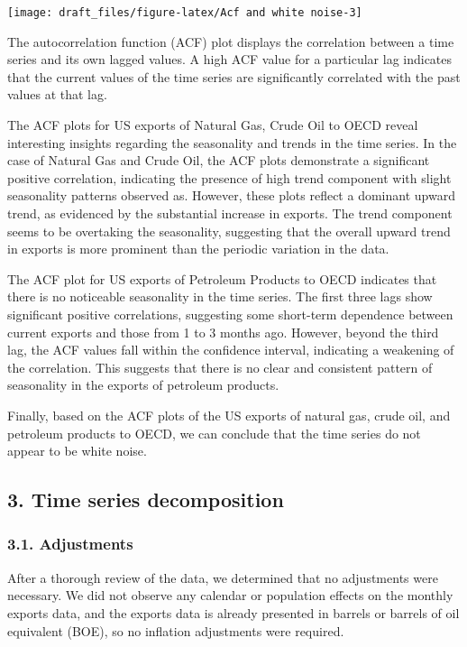 \documentclass[
]{article}
\begin{document}
\begin{center}\texttt{[image: draft\_files/figure-latex/Acf and white noise-3]} \end{center}

The autocorrelation function (ACF) plot displays the correlation between
a time series and its own lagged values. A high ACF value for a
particular lag indicates that the current values of the time series are
significantly correlated with the past values at that lag.

The ACF plots for US exports of Natural Gas, Crude Oil to OECD reveal
interesting insights regarding the seasonality and trends in the time
series. In the case of Natural Gas and Crude Oil, the ACF plots
demonstrate a significant positive correlation, indicating the presence
of high trend component with slight seasonality patterns observed as.
However, these plots reflect a dominant upward trend, as evidenced by
the substantial increase in exports. The trend component seems to be
overtaking the seasonality, suggesting that the overall upward trend in
exports is more prominent than the periodic variation in the data.

The ACF plot for US exports of Petroleum Products to OECD indicates that
there is no noticeable seasonality in the time series. The first three
lags show significant positive correlations, suggesting some short-term
dependence between current exports and those from 1 to 3 months ago.
However, beyond the third lag, the ACF values fall within the confidence
interval, indicating a weakening of the correlation. This suggests that
there is no clear and consistent pattern of seasonality in the exports
of petroleum products.

Finally, based on the ACF plots of the US exports of natural gas, crude
oil, and petroleum products to OECD, we can conclude that the time
series do not appear to be white noise.

\hypertarget{time-series-decomposition}{%
\subsection{3. Time series
decomposition}\label{time-series-decomposition}}

\hypertarget{adjustments}{%
\subsubsection{3.1. Adjustments}\label{adjustments}}

After a thorough review of the data, we determined that no adjustments
were necessary. We did not observe any calendar or population effects on
the monthly exports data, and the exports data is already presented in
barrels or barrels of oil equivalent (BOE), so no inflation adjustments
were required.
\end{document}
